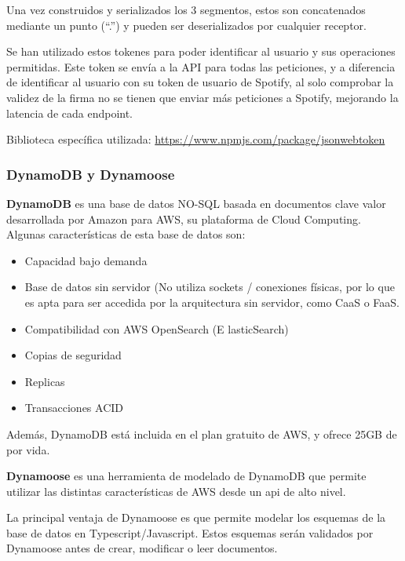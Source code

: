 Una vez construidos y serializados los 3 segmentos, estos son
concatenados mediante un punto (``.'') y pueden ser deserializados por
cualquier receptor.

Se han utilizado estos tokenes para poder identificar al usuario y sus operaciones permitidas. Este token se envía a la API para todas las peticiones, y a diferencia de identificar al usuario con su token de usuario de Spotify, al solo comprobar la validez de la firma no se tienen que enviar más peticiones a Spotify, mejorando la latencia de cada endpoint. 

Biblioteca específica utilizada: \href{https://www.npmjs.com/package/jsonwebtoken}{https://www.npmjs.com/package/jsonwebtoken}

\hypertarget{dynamodb-y-dynamoose}{%
\subsubsection{DynamoDB y Dynamoose}\label{dynamodb-y-dynamoose}}

\textbf{DynamoDB} es una base de datos NO-SQL basada en documentos clave
valor desarrollada por Amazon para AWS, su plataforma de Cloud
Computing.\\
Algunas características de esta base de datos son:

\begin{itemize}
\item
  Capacidad bajo demanda
\item
  Base de datos sin servidor (No utiliza sockets / conexiones físicas,
  por lo que es apta para ser accedida por la arquitectura sin servidor,
  como CaaS o FaaS.
\item
  Compatibilidad con AWS OpenSearch (E lasticSearch)
\item
  Copias de seguridad
\item
  Replicas
\item
  Transacciones ACID
\end{itemize}

Además, DynamoDB está incluida en el plan gratuito de AWS, y ofrece 25GB
de por vida.

\textbf{Dynamoose} es una herramienta de modelado de DynamoDB que permite utilizar las distintas características de AWS
desde un api de alto nivel.

La principal ventaja de Dynamoose es que permite modelar los esquemas de
la base de datos en Typescript/Javascript. Estos esquemas serán
validados por Dynamoose antes de crear, modificar o leer documentos.

